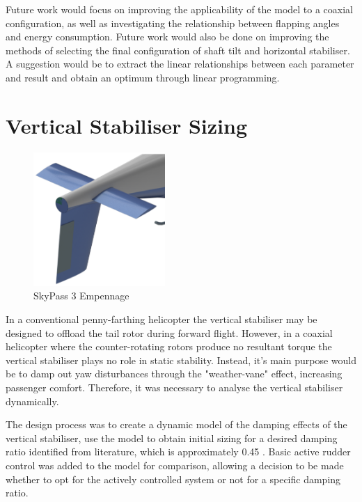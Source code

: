 \documentclass[11pt,a4paper]{article}
\begin{document}
Future work would focus on improving the applicability of the model to a coaxial configuration, as well as investigating the relationship between flapping angles and energy consumption. Future work would also be done on improving the methods of selecting the final configuration of shaft tilt and horizontal stabiliser. A suggestion would be to extract the linear relationships between each parameter and result and obtain an optimum through linear programming.





\section{Vertical Stabiliser Sizing}


\begin{figure}
    \includegraphics[width=5cm]{Empennage.png}
    \caption{SkyPass 3 Empennage }
    \label{fig:emp}
\end{figure}
In a conventional penny-farthing helicopter the vertical stabiliser may be designed to offload the tail rotor during forward flight. However, in a coaxial helicopter where the counter-rotating rotors produce no resultant torque the vertical stabiliser plays no role in static stability. Instead, it's main purpose would be to damp out yaw disturbances through the "weather-vane" effect, increasing passenger comfort. Therefore, it was necessary to analyse the vertical stabiliser dynamically.


The design process was to create a dynamic model of the damping effects of the vertical stabiliser, use the model to obtain initial sizing for a desired damping ratio identified from literature, which is approximately 0.45 \cite{prouty}. Basic active rudder control was added to the model for comparison, allowing a decision to be made whether to opt for the actively controlled system or not for a specific damping ratio.
\end{document}
